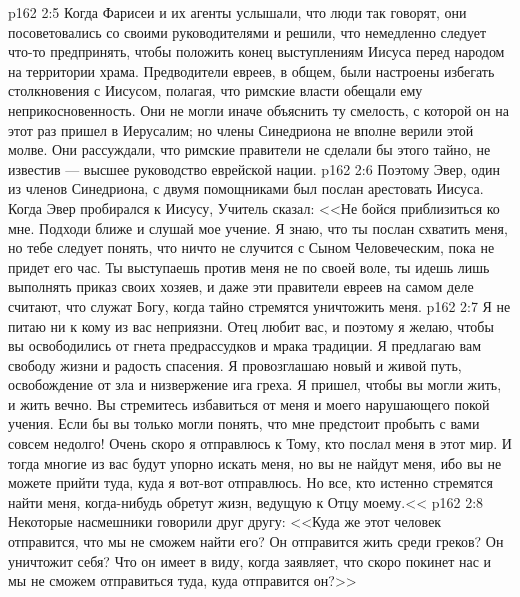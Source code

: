 \vs p162 2:5 Когда Фарисеи и их агенты услышали, что люди так говорят, они посоветовались со своими руководителями и решили, что немедленно следует что\hyp{}то предпринять, чтобы положить конец выступлениям Иисуса перед народом на территории храма. Предводители евреев, в общем, были настроены избегать столкновения с Иисусом, полагая, что римские власти обещали ему неприкосновенность. Они не могли иначе объяснить ту смелость, с которой он на этот раз пришел в Иерусалим; но члены Синедриона не вполне верили этой молве. Они рассуждали, что римские правители не сделали бы этого тайно, не известив --- высшее руководство еврейской нации.
\vs p162 2:6 Поэтому Эвер, один из членов Синедриона, с двумя помощниками был послан арестовать Иисуса. Когда Эвер пробирался к Иисусу, Учитель сказал: <<Не бойся приблизиться ко мне. Подходи ближе и слушай мое учение. Я знаю, что ты послан схватить меня, но тебе следует понять, что ничто не случится с Сыном Человеческим, пока не придет его час. Ты выступаешь против меня не по своей воле, ты идешь лишь выполнять приказ своих хозяев, и даже эти правители евреев на самом деле считают, что служат Богу, когда тайно стремятся уничтожить меня.
\vs p162 2:7 Я не питаю ни к кому из вас неприязни. Отец любит вас, и поэтому я желаю, чтобы вы освободились от гнета предрассудков и мрака традиции. Я предлагаю вам свободу жизни и радость спасения. Я провозглашаю новый и живой путь, освобождение от зла и низвержение ига греха. Я пришел, чтобы вы могли жить, и жить вечно. Вы стремитесь избавиться от меня и моего нарушающего покой учения. Если бы вы только могли понять, что мне предстоит пробыть с вами совсем недолго! Очень скоро я отправлюсь к Тому, кто послал меня в этот мир. И тогда многие из вас будут упорно искать меня, но вы не найдут меня, ибо вы не можете прийти туда, куда я вот\hyp{}вот отправлюсь. Но все, кто истенно стремятся найти меня, когда\hyp{}нибудь обретут жизн, ведущую к Отцу моему.<<
\vs p162 2:8 Некоторые насмешники говорили друг другу: <<Куда же этот человек отправится, что мы не сможем найти его? Он отправится жить среди греков? Он уничтожит себя? Что он имеет в виду, когда заявляет, что скоро покинет нас и мы не сможем отправиться туда, куда отправится он?>>
